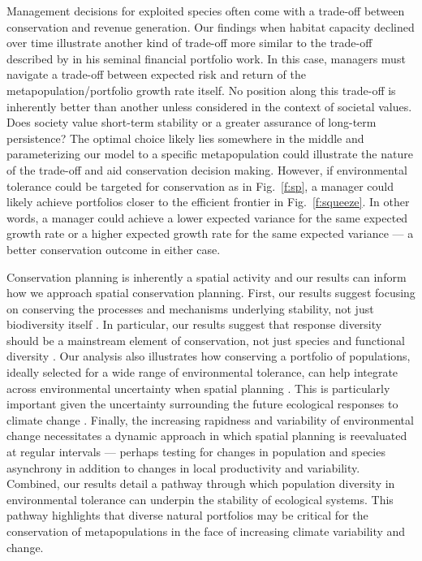 \documentclass[12pt,english]{article}
\begin{document}
\begin{spacing}{1.3}
Management decisions for exploited species often come with a trade-off between conservation and revenue generation. Our findings when habitat capacity declined over time illustrate another kind of trade-off more similar to the trade-off described by \citet{markowitz1952} in his seminal financial portfolio work. In this case, managers must navigate a trade-off between expected risk and return of the metapopulation/portfolio growth rate itself. No position along this trade-off is inherently better than another unless considered in the context of societal values. Does society value short-term stability or a greater assurance of long-term persistence? The optimal choice likely lies somewhere in the middle and parameterizing our model to a specific metapopulation could illustrate the nature of the trade-off and aid conservation decision making. However, if environmental tolerance could be targeted for conservation as in Fig.~\ref{f:sp}, a manager could likely achieve portfolios closer to the efficient frontier in Fig.~\ref{f:squeeze}. In other words, a manager could achieve a lower expected variance for the same expected growth rate or a higher expected growth rate for the same expected variance --- a better conservation outcome in either case.

Conservation planning is inherently a spatial activity \citep{pressey2007} and our results can inform how we approach spatial conservation planning. First, our results suggest focusing on conserving the processes and mechanisms underlying stability, not just biodiversity itself \citep{pressey2007, beechie2013}. In particular, our results suggest that response diversity should be a mainstream element of conservation, not just species and functional diversity \citep{mori2013}. Our analysis also illustrates how conserving a portfolio of populations, ideally selected for a wide range of environmental tolerance, can help integrate across environmental uncertainty when spatial planning \citep{ando2012}. This is particularly important given the uncertainty surrounding the future ecological responses to climate change \citep{walther2002}. Finally, the increasing rapidness and variability of environmental change necessitates a dynamic approach in which spatial planning is reevaluated at regular intervals \citep{hannah2002a} --- perhaps testing for changes in population and species asynchrony in addition to changes in local productivity and variability. Combined, our results detail a pathway through which population diversity in environmental tolerance can underpin the stability of ecological systems. This pathway highlights that diverse natural portfolios may be critical for the conservation of metapopulations in the face of increasing climate variability and change.


\end{spacing}
\end{document}
